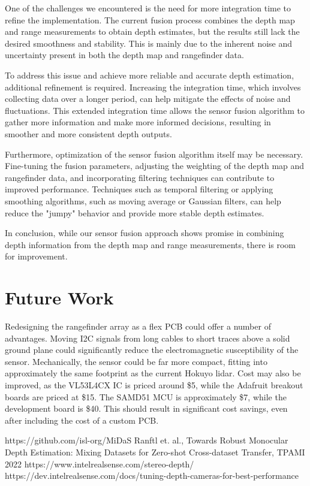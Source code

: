\documentclass[conference]{IEEEtran}
\begin{document}
One of the challenges we encountered is the need for more integration time to refine the implementation. The current fusion process combines the depth map and range measurements to obtain depth estimates, but the results still lack the desired smoothness and stability. This is mainly due to the inherent noise and uncertainty present in both the depth map and rangefinder data.

To address this issue and achieve more reliable and accurate depth estimation, additional refinement is required. Increasing the integration time, which involves collecting data over a longer period, can help mitigate the effects of noise and fluctuations. This extended integration time allows the sensor fusion algorithm to gather more information and make more informed decisions, resulting in smoother and more consistent depth outputs.

Furthermore, optimization of the sensor fusion algorithm itself may be necessary. Fine-tuning the fusion parameters, adjusting the weighting of the depth map and rangefinder data, and incorporating filtering techniques can contribute to improved performance. Techniques such as temporal filtering or applying smoothing algorithms, such as moving average or Gaussian filters, can help reduce the "jumpy" behavior and provide more stable depth estimates.

In conclusion, while our sensor fusion approach shows promise in combining depth information from the depth map and range measurements, there is room for improvement. 

\section{Future Work}
Redesigning the rangefinder array as a flex PCB could offer a number of
advantages. Moving I2C signals from long cables to short traces above a solid
ground plane could significantly reduce the electromagnetic susceptibility of
the sensor. Mechanically, the sensor could be far more compact, fitting into
approximately the same footprint as the current Hokuyo lidar. Cost may also be
improved, as the VL53L4CX IC is priced around \$5, while the Adafruit breakout
boards are priced at \$15. The SAMD51 MCU is approximately \$7, while the
development board is \$40. This should result in significant cost savings, even
after including the cost of a custom PCB.



\begin{thebibliography}{00}
 https://github.com/isl-org/MiDaS
 Ranftl et. al., Towards Robust Monocular Depth Estimation:
Mixing Datasets for Zero-shot Cross-dataset Transfer, TPAMI 2022
 https://www.intelrealsense.com/stereo-depth/
 https://dev.intelrealsense.com/docs/tuning-depth-cameras-for-best-performance
\end{thebibliography}
\end{document}
